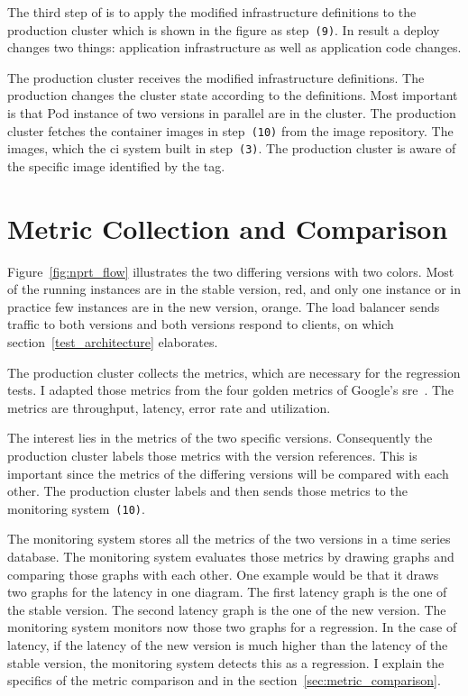 The third step of \deployer is to apply the modified infrastructure definitions to the
production cluster which is shown in the figure as step~\texttt{(9)}. In result a deploy
changes two things: application infrastructure as well as application code changes.

The production cluster receives the modified infrastructure definitions. The production
changes the cluster state according to the definitions. Most important is that Pod
instance of two versions in parallel are in the cluster. The production cluster fetches
the container images in step~\texttt{(10)} from the image repository. The images, which
the \gls{ci} system built in step~\texttt{(3)}. The production cluster is aware of the
specific image identified by the tag.

\section{Metric Collection and Comparison}

Figure~\ref{fig:nprt_flow} illustrates the two differing versions with two colors. Most of
the running instances are in the stable version, red, and only one instance or in practice
few instances are in the new version, orange. The load balancer sends traffic to both
versions and both versions respond to clients, on which section~\ref{test_architecture}
elaborates.

The production cluster collects the metrics, which are necessary for the regression tests.
I adapted those metrics from the four golden metrics of Google's
\gls{sre}~\cite{sre_monitoring}. The metrics are throughput, latency, error rate and
utilization.

The interest lies in the metrics of the two specific versions. Consequently the production
cluster labels those metrics with the version references. This is important since the
metrics of the differing versions will be compared with each other. The production cluster
labels and then sends those metrics to the monitoring system~\texttt{(10)}.

The monitoring system stores all the metrics of the two versions in a time series
database. The monitoring system evaluates those metrics by drawing graphs and comparing
those graphs with each other. One example would be that it draws two graphs for the
latency in one diagram. The first latency graph is the one of the stable version. The
second latency graph is the one of the new version. The monitoring system monitors now
those two graphs for a regression. In the case of latency, if the latency of the new
version is much higher than the latency of the stable version, the monitoring system
detects this as a regression. I explain the specifics of the metric comparison and in the
section~\ref{sec:metric_comparison}.

